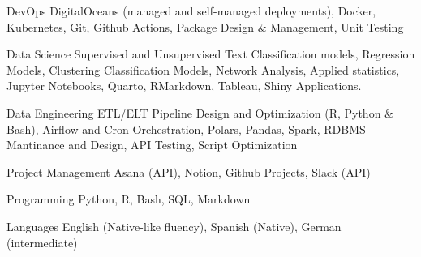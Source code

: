

\begin{cvskills}

  \cvskill
    {DevOps} %
    {DigitalOceans (managed and self-managed deployments), Docker, Kubernetes, Git, Github Actions, Package Design \& Management, Unit Testing} %

  \cvskill
    {Data Science} %
    {Supervised and Unsupervised Text Classification models, Regression Models, Clustering Classification Models, Network Analysis, Applied statistics, Jupyter Notebooks, Quarto, RMarkdown, Tableau, Shiny Applications.} %

  \cvskill
    {Data Engineering} %
    {ETL/ELT Pipeline Design and Optimization (R, Python \& Bash), Airflow and Cron Orchestration, Polars, Pandas, Spark, RDBMS Mantinance and Design, API Testing, Script Optimization} %

  \cvskill
    {Project Management} %
    {Asana (API), Notion, Github Projects, Slack (API)} %

  \cvskill
    {Programming} %
    {Python, R, Bash, SQL, Markdown} %

  \cvskill
    {Languages} %
    {English (Native-like fluency), Spanish (Native), German (intermediate)} %

\end{cvskills}
